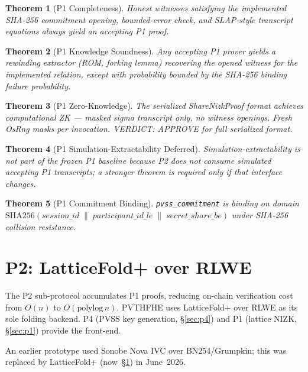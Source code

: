\documentclass{llncs}
\newtheorem{theorem}{Theorem}[section]
\begin{document}
\begin{theorem}[P1 Completeness]
\label{thm:p1-t1}
Honest witnesses satisfying the implemented SHA-256 commitment opening, bounded-error check,
and SLAP-style transcript equations always yield an accepting P1 proof.
\end{theorem}

\begin{theorem}[P1 Knowledge Soundness]
\label{thm:p1-t2}
Any accepting P1 prover yields a rewinding extractor (ROM, forking lemma) recovering the opened witness for the
implemented relation, except with probability bounded by the SHA-256 binding failure probability.
\end{theorem}

\begin{theorem}[P1 Zero-Knowledge]
\label{thm:p1-t3}
The serialized ShareNizkProof format achieves computational ZK — masked sigma transcript only, no witness openings. Fresh OsRng masks per invocation. VERDICT: APPROVE for full serialized format.
\end{theorem}


\begin{theorem}[P1 Simulation-Extractability Deferred]
\label{thm:p1-t4}
Simulation-extractability is not part of the frozen P1 baseline because P2 does not consume
simulated accepting P1 transcripts; a stronger theorem is required only if that interface
changes.
\end{theorem}

\begin{theorem}[P1 Commitment Binding]
\label{thm:p1-t5}
\texttt{pvss\_commitment} is binding on domain $\mathrm{SHA256}(\mathit{session\_id} \;\|\;
\mathit{participant\_id\_le} \;\|\; \mathit{secret\_share\_be})$ under SHA-256 collision resistance.
\end{theorem}

\section{P2: LatticeFold+ over RLWE}
\label{sec:p2}

The P2 sub-protocol accumulates P1 proofs, reducing on-chain verification
cost from $O(n)$ to $O(\text{polylog}\, n)$.  PVTHFHE uses
LatticeFold+ over RLWE as its sole folding backend.  P4 (PVSS key
generation, \S\ref{sec:p4}) and P1 (lattice NIZK, \S\ref{sec:p1}) provide
the front-end.

An earlier prototype used Sonobe Nova IVC over BN254/Grumpkin; this was
replaced by LatticeFold+ (now~\S\ref{sec:p2}) in June~2026.
\end{document}
